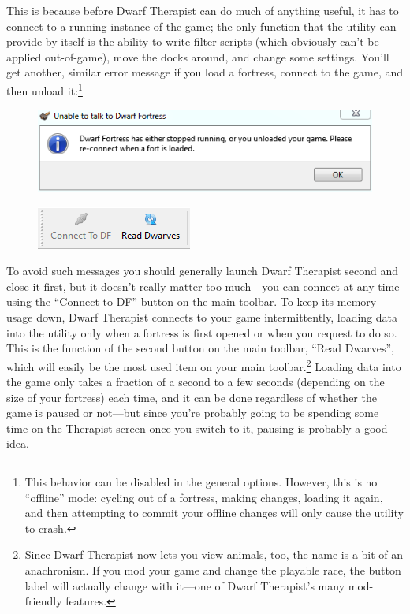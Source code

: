 \documentclass[]{article}
\begin{document}
This is because before Dwarf Therapist can do much of anything useful, it has to connect to a running
instance of the game; the only function that the utility can provide by itself is the ability to write
filter scripts (which obviously can't be applied out-of-game), move the docks around, and change some
settings. You'll get another, similar error message if you load a fortress, connect to the game, and then
unload it:\footnote{This behavior can be disabled in the general options. However, this is no ``offline''
mode: cycling out of a fortress, making changes, loading it again, and then attempting to commit your
offline changes will only cause the utility to crash.}

\begin{figure}[h!] \centering
\includegraphics[width=.7\linewidth]{Sec1Fig2}
\end{figure}

\begin{figure}
\vspace{-20pt}
  \begin{center}
    \includegraphics[scale=1]{Sec1Fig3}
  \end{center}
  \vspace{-10pt}
  \end{figure}
  
To avoid such messages you should generally launch Dwarf Therapist second and close it first, but it
doesn't really matter too much---you can connect at any time using the ``Connect to DF'' button on the
main toolbar. To keep its memory usage down, Dwarf Therapist connects to your game intermittently, loading
data into the utility only when a fortress is first opened or when you request to do so. This is the
function of the second button on the main toolbar, ``Read Dwarves'', which will easily be the most used
item on your main toolbar.\footnote{Since Dwarf Therapist now lets you view animals, too, the name is a
bit of an anachronism. If you mod your game and change the playable race, the button label will actually
change with it---one of Dwarf Therapist's many mod-friendly features.} Loading data into the game only
takes a fraction of a second to a few seconds (depending on the size of your fortress) each time, and it
can be done regardless of whether the game is paused or not---but since you're probably going to be
spending some time on the Therapist screen once you switch to it, pausing is probably a good idea.
\newpage
\end{document}
